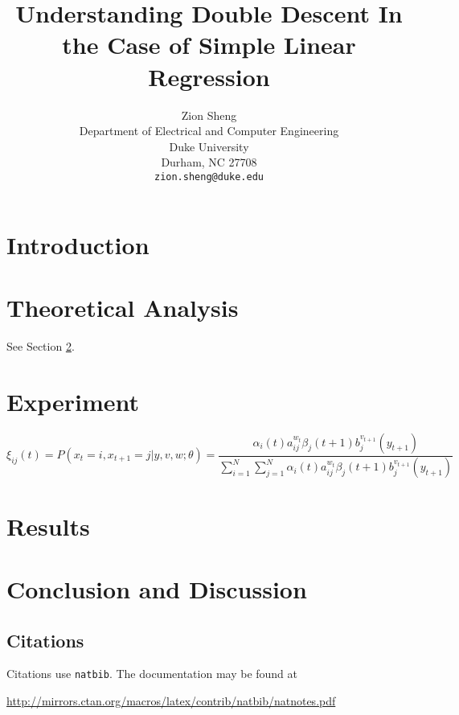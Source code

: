 \documentclass{article}
\title{Understanding Double Descent In the Case of Simple Linear Regression}
\author{
	Zion Sheng\\
	Department of Electrical and Computer Engineering\\
	Duke University\\
	Durham, NC 27708 \\
	\texttt{zion.sheng@duke.edu} \\
}
\date{} %
\begin{document}
	\maketitle
	
	\begin{abstract}
		\lipsum[1]
	\end{abstract}
	
	
	
	
	\section{Introduction}
	\lipsum[2]
	\lipsum[3]
	
	
	\section{Theoretical Analysis}
	\label{sec:headings}
	
	\lipsum[4] See Section \ref{sec:headings}.
	
	\section{Experiment}
	\lipsum[5]
	\begin{equation}
		\xi _{ij}(t)=P(x_{t}=i,x_{t+1}=j|y,v,w;\theta)= {\frac {\alpha _{i}(t)a^{w_t}_{ij}\beta _{j}(t+1)b^{v_{t+1}}_{j}(y_{t+1})}{\sum _{i=1}^{N} \sum _{j=1}^{N} \alpha _{i}(t)a^{w_t}_{ij}\beta _{j}(t+1)b^{v_{t+1}}_{j}(y_{t+1})}}
	\end{equation}
	
	\section{Results}
	\lipsum[6]
	
	\section{Conclusion and Discussion}
	\lipsum[7]
	
	\subsection{Citations}
	Citations use \verb+natbib+. The documentation may be found at
	\begin{center}
		\url{http://mirrors.ctan.org/macros/latex/contrib/natbib/natnotes.pdf}
	\end{center}
	
\end{document}
